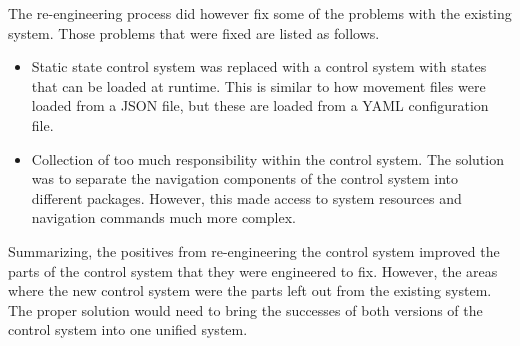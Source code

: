 \documentclass[
11pt, %
oneside, %
english, %
singlespacing, %
parskip, %
headsepline, %
chapterinoneline, %
]{MastersDoctoralThesis} %
\begin{document}
The re-engineering process did however fix some of the problems with the
existing system. Those problems that were fixed are listed as follows.

\begin{itemize}
\item Static state control system was replaced with a control system with states
  that can be loaded at runtime.
  This is similar to how movement files were loaded from a JSON file, but these
  are loaded from a YAML configuration file.
\item Collection of too much responsibility within the control system.
  The solution was to separate the navigation components of the control system
  into different packages. However, this made access to system resources and
  navigation commands much more complex.
\end{itemize}

Summarizing, the positives from re-engineering the control system improved the
parts of the control system that they were engineered to fix.
However, the areas where the new control system were the parts left out from the
existing system.
The proper solution would need to bring the successes of both versions of the
control system into one unified system.

\printglossaries %


\mainmatter %

\pagestyle{thesis} %









\appendix %


%
%
%



\end{document}

